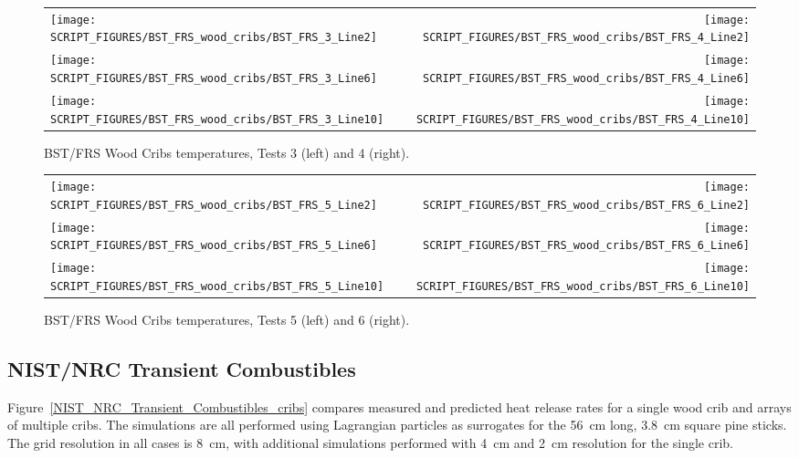 \begin{figure}[p]
\begin{tabular*}{\textwidth}{l@{\extracolsep{\fill}}r}
\texttt{[image: SCRIPT\_FIGURES/BST\_FRS\_wood\_cribs/BST\_FRS\_3\_Line2]} &
\texttt{[image: SCRIPT\_FIGURES/BST\_FRS\_wood\_cribs/BST\_FRS\_4\_Line2]} \\
\texttt{[image: SCRIPT\_FIGURES/BST\_FRS\_wood\_cribs/BST\_FRS\_3\_Line6]} &
\texttt{[image: SCRIPT\_FIGURES/BST\_FRS\_wood\_cribs/BST\_FRS\_4\_Line6]} \\
\texttt{[image: SCRIPT\_FIGURES/BST\_FRS\_wood\_cribs/BST\_FRS\_3\_Line10]} &
\texttt{[image: SCRIPT\_FIGURES/BST\_FRS\_wood\_cribs/BST\_FRS\_4\_Line10]}
\end{tabular*}
\caption[BST/FRS Wood Cribs temperatures, Tests 3 and 4]{BST/FRS Wood Cribs temperatures, Tests 3 (left) and 4 (right).}
\label{BST_FRS_wood_cribs_Tests_3to4}
\end{figure}

\begin{figure}[p]
\begin{tabular*}{\textwidth}{l@{\extracolsep{\fill}}r}
\texttt{[image: SCRIPT\_FIGURES/BST\_FRS\_wood\_cribs/BST\_FRS\_5\_Line2]} &
\texttt{[image: SCRIPT\_FIGURES/BST\_FRS\_wood\_cribs/BST\_FRS\_6\_Line2]} \\
\texttt{[image: SCRIPT\_FIGURES/BST\_FRS\_wood\_cribs/BST\_FRS\_5\_Line6]} &
\texttt{[image: SCRIPT\_FIGURES/BST\_FRS\_wood\_cribs/BST\_FRS\_6\_Line6]} \\
\texttt{[image: SCRIPT\_FIGURES/BST\_FRS\_wood\_cribs/BST\_FRS\_5\_Line10]} &
\texttt{[image: SCRIPT\_FIGURES/BST\_FRS\_wood\_cribs/BST\_FRS\_6\_Line10]}
\end{tabular*}
\caption[BST/FRS Wood Cribs temperatures, Tests 5 and 6]{BST/FRS Wood Cribs temperatures, Tests 5 (left) and 6 (right).}
\label{BST_FRS_wood_cribs_Tests_5to6}
\end{figure}

\clearpage


\subsection{NIST/NRC Transient Combustibles}

Figure~\ref{NIST_NRC_Transient_Combustibles_cribs} compares measured and predicted heat release rates for a single wood crib and arrays of multiple cribs. The simulations are all performed using Lagrangian particles as surrogates for the 56~cm long, 3.8~cm square pine sticks. The grid resolution in all cases is 8~cm, with additional simulations performed with 4~cm and 2~cm resolution for the single crib.

